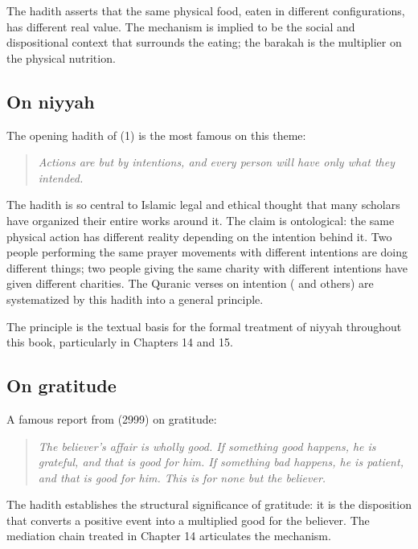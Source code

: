 The hadith asserts that the same physical food, eaten in different
configurations, has different real value. The mechanism is implied
to be the social and dispositional context that surrounds the eating;
the barakah is the multiplier on the physical nutrition.

\subsection{On niyyah}

The opening hadith of  (1) is the most
famous on this theme:

\begin{quote}
\textit{Actions are but by intentions, and every person will have
only what they intended.}
\end{quote}

The hadith is so central to Islamic legal and ethical thought that
many scholars have organized their entire works around it. The claim
is ontological: the same physical action has different reality
depending on the intention behind it. Two people performing the same
prayer movements with different intentions are doing different
things; two people giving the same charity with different intentions
have given different charities. The Quranic verses on intention
( and others) are systematized by this hadith into a
general principle.

The principle is the textual basis for the formal treatment of
niyyah throughout this book, particularly in Chapters 14 and 15.

\subsection{On gratitude}

A famous report from  (2999) on gratitude:

\begin{quote}
\textit{The believer's affair is wholly good. If something good
happens, he is grateful, and that is good for him. If something bad
happens, he is patient, and that is good for him. This is for none
but the believer.}
\end{quote}

The hadith establishes the structural significance of gratitude: it
is the disposition that converts a positive event into a multiplied
good for the believer. The mediation chain treated in Chapter 14
articulates the mechanism.

